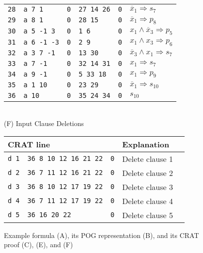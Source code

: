 \documentclass[letterpaper,USenglish,cleveref, autoref, thm-restate]{lipics-v2021}
\newcommand{\obar}[1]{\overline{#1}}
\newcommand{\imply}{\Rightarrow}
\begin{document}
\begin{figure}
\begin{minipage}{0.49\textwidth}
\begin{tabular}{llllll}
\texttt{28} & \texttt{a 7 1} & \texttt{0} & \texttt{27 14 26} & \texttt{0} & $\obar{x}_1 \imply s_7$  \\
\texttt{29} & \texttt{a 8 1} & \texttt{0} & \texttt{28 15} & \texttt{0} & $\obar{x}_1 \imply p_8$  \\
\texttt{30} & \texttt{a 5 -1 3} & \texttt{0} & \texttt{1 6} & \texttt{0} & $x_1 \land \obar{x}_3 \imply p_5$ \\
\texttt{31} & \texttt{a 6 -1 -3} & \texttt{0} & \texttt{2 9} & \texttt{0} & $x_1 \land x_3 \imply p_6$ \\
\texttt{32} & \texttt{a 3 7 -1} & \texttt{0} & \texttt{13 30} & \texttt{0} & $\obar{x}_3 \land x_1 \imply s_7$  \\
\texttt{33} & \texttt{a 7 -1} & \texttt{0} & \texttt{32 14 31} & \texttt{0} & $x_1 \imply s_7$  \\
\texttt{34} & \texttt{a 9 -1} & \texttt{0} & \texttt{5 33 18} & \texttt{0} & $x_1 \imply p_9$  \\
\texttt{35} & \texttt{a 1 10} & \texttt{0} & \texttt{23 29} & \texttt{0} & $\obar{x}_1 \imply s_{10}$  \\
\texttt{36} & \texttt{a 10} & \texttt{0} & \texttt{35 24 34} & \texttt{0} & $s_{10}$ \\
\bottomrule
\end{tabular}
\\[1.5ex]
(F) Input Clause Deletions\\[1.2ex]
\begin{tabular}{lllll}
  \toprule
 \multicolumn{3}{l}{CRAT line} & Explanation\\
\midrule
 \texttt{d 1} & \texttt{36 8 10 12 16 21 22} & \texttt{0} & Delete clause 1 \\
 \texttt{d 2} & \texttt{36 7 11 12 16 21 22} & \texttt{0} & Delete clause 2 \\
 \texttt{d 3} & \texttt{36 8 10 12 17 19 22} & \texttt{0} & Delete clause 3 \\
 \texttt{d 4} & \texttt{36 7 11 12 17 19 22} & \texttt{0} & Delete clause 4 \\
 \texttt{d 5} & \texttt{36 16 20 22} & \texttt{0} &  Delete clause 5 \\
\bottomrule
\end{tabular}
\end{minipage}
\caption{Example formula (A), its POG representation (B), and its CRAT proof (C), (E), and (F)}
\label{fig:eg4:all}
\end{figure}
\end{document}
